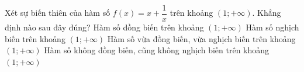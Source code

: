 \begin{ex}
\begin{ex}%
    Xét sự biến thiên của hàm số $f(x)=x+\dfrac{1}{x}$ trên khoảng $\left(1;+\infty \right)$. Khẳng định nào sau đây đúng?
    \choice
    {\True Hàm số đồng biến trên khoảng $\left(1;+\infty \right)$}
    {Hàm số nghịch biến trên khoảng $\left(1;+\infty \right)$}
    {Hàm số vừa đồng biến, vừa nghịch biến trên khoảng $\left(1;+\infty \right)$}
    {Hàm số không đồng biến, cũng không nghịch biến trên khoảng $\left(1;+\infty \right)$}
\end{ex}


\end{ex}
